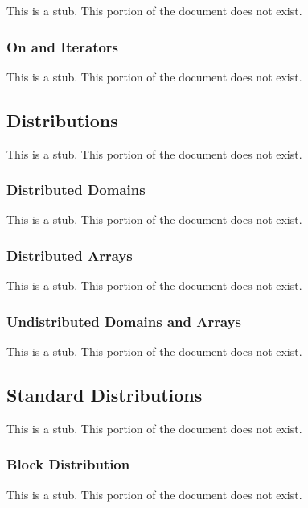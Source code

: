 This is a stub.  This portion of the document does not exist.

\subsubsection{On and Iterators}
\label{On_and_Iterators}

This is a stub.  This portion of the document does not exist.

\subsection{Distributions}
\label{Distributions}

This is a stub.  This portion of the document does not exist.

\subsubsection{Distributed Domains}
\label{Distributed_Domains}

This is a stub.  This portion of the document does not exist.

\subsubsection{Distributed Arrays}
\label{Distributed_Arrays}

This is a stub.  This portion of the document does not exist.

\subsubsection{Undistributed Domains and Arrays}
\label{Undistributed_Domains_and_Arrays}

This is a stub.  This portion of the document does not exist.

\subsection{Standard Distributions}
\label{Standard_Distributions}

This is a stub.  This portion of the document does not exist.

\subsubsection{Block Distribution}
\label{Block_Distribution}

This is a stub.  This portion of the document does not exist.

